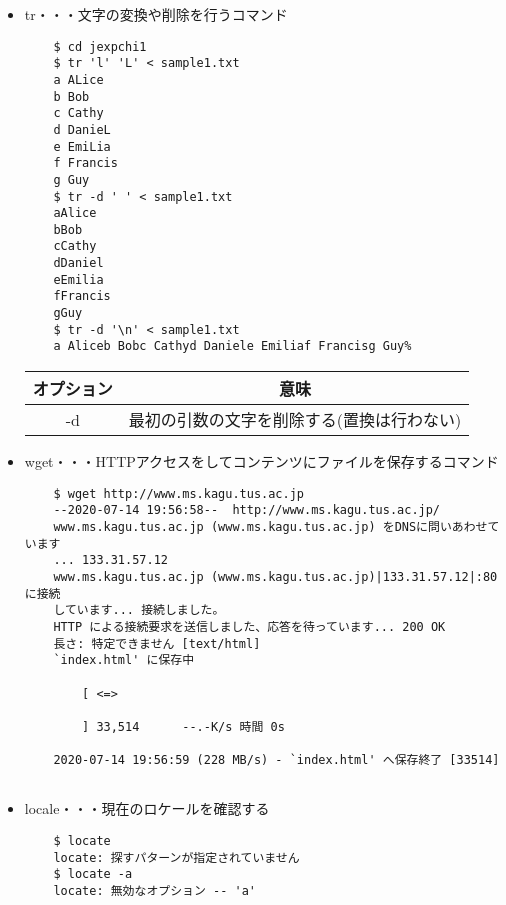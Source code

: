 \documentclass[a4paper,12pt]{jarticle}
\begin{document}
\begin{itemize}
    \item tr・・・文字の変換や削除を行うコマンド
          \begin{lstlisting}
    $ cd jexpchi1
    $ tr 'l' 'L' < sample1.txt
    a ALice
    b Bob
    c Cathy
    d DanieL
    e EmiLia
    f Francis
    g Guy
    $ tr -d ' ' < sample1.txt
    aAlice
    bBob
    cCathy
    dDaniel
    eEmilia
    fFrancis
    gGuy
    $ tr -d '\n' < sample1.txt
    a Aliceb Bobc Cathyd Daniele Emiliaf Francisg Guy%
                           \end{lstlisting}
          \begin{table}[h]
              \begin{center}
                  \begin{tabular}{|c|c|}
                      \hline
                      オプション & 意味                                       \\ \hline
                      -d         & 最初の引数の文字を削除する(置換は行わない) \\      \hline
                  \end{tabular}
              \end{center}
          \end{table}
    \item wget・・・HTTPアクセスをしてコンテンツにファイルを保存するコマンド
          \begin{lstlisting}
    $ wget http://www.ms.kagu.tus.ac.jp
    --2020-07-14 19:56:58--  http://www.ms.kagu.tus.ac.jp/
    www.ms.kagu.tus.ac.jp (www.ms.kagu.tus.ac.jp) をDNSに問いあわせています
    ... 133.31.57.12
    www.ms.kagu.tus.ac.jp (www.ms.kagu.tus.ac.jp)|133.31.57.12|:80 に接続
    しています... 接続しました。
    HTTP による接続要求を送信しました、応答を待っています... 200 OK
    長さ: 特定できません [text/html]
    `index.html' に保存中
    
        [ <=>                                       
                                                       
        ] 33,514      --.-K/s 時間 0s
    
    2020-07-14 19:56:59 (228 MB/s) - `index.html' へ保存終了 [33514]
    
                           \end{lstlisting}
          \clearpage
    \item locale・・・現在のロケールを確認する
          \begin{lstlisting}
    $ locate
    locate: 探すパターンが指定されていません
    $ locate -a 
    locate: 無効なオプション -- 'a'
                           \end{lstlisting}
\end{itemize}
\end{document}
